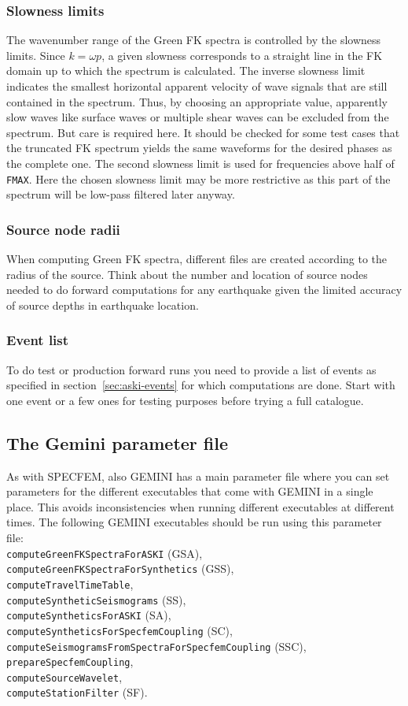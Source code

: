 \subsubsection{Slowness limits}
	The wavenumber range of the Green FK spectra is controlled by the slowness limits. Since $k=\omega p$, a given slowness corresponds to a straight line in the FK domain up to which the spectrum is calculated. The inverse slowness limit indicates the smallest horizontal apparent velocity of wave signals that are still contained in the spectrum. Thus, by choosing an appropriate value, apparently slow waves like surface waves or multiple shear waves can be excluded from the spectrum. But care is required here. It should be checked for some test cases that the truncated FK spectrum yields the same waveforms for the desired phases as the complete one. The second slowness limit is used for frequencies above half of \verb+FMAX+. Here the chosen slowness limit may be more restrictive as this part of the spectrum will be low-pass filtered later anyway.
%
\subsubsection{Source node radii}
	When computing Green FK spectra, different files are created according to the radius of the source. Think about the number and location of source nodes needed to do forward computations for any earthquake given the limited accuracy of source depths in earthquake location.
%
\subsubsection{Event list}
	To do test or production forward runs you need to provide a list of events as specified in section~\ref{sec:aski-events} for which computations are done. Start with one event or a few ones for testing purposes before trying a full catalogue.
%
\subsection{The Gemini parameter file}
%
As with SPECFEM, also GEMINI has a main parameter file where you can set parameters for the different executables that come with GEMINI in a single place. This avoids inconsistencies when running different executables at different times. The following GEMINI executables should be run using this parameter file:\\
 \verb+computeGreenFKSpectraForASKI+ (GSA),\\
 \verb+computeGreenFKSpectraForSynthetics+ (GSS),\\
 \verb+computeTravelTimeTable+,\\
 \verb+computeSyntheticSeismograms+ (SS),\\
 \verb+computeSyntheticsForASKI+ (SA),\\
 \verb+computeSyntheticsForSpecfemCoupling+ (SC),\\
 \verb+computeSeismogramsFromSpectraForSpecfemCoupling+ (SSC),\\
 \verb+prepareSpecfemCoupling+,\\
 \verb+computeSourceWavelet+,\\
 \verb+computeStationFilter+ (SF).

